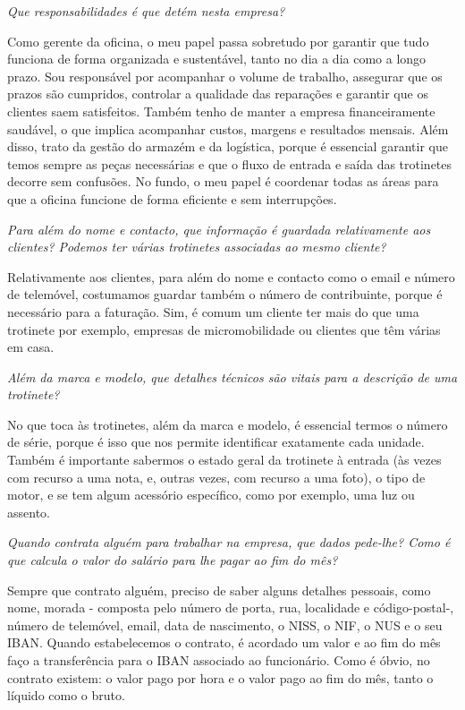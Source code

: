 \documentclass[11pt,a4paper]{article}
\newcommand{\pergunta}[1]{\item[P:] \textit{#1}}
\newcommand{\resposta}[1]{\item[R:] #1}
\begin{document}
	\begin{transcription}
		
		\pergunta{Que responsabilidades é que detém nesta empresa?}
		
		\resposta{Como gerente da oficina, o meu papel passa sobretudo por garantir que tudo funciona de forma organizada e sustentável, tanto no dia a dia como a longo prazo. Sou responsável por acompanhar o volume de trabalho, assegurar que os prazos são cumpridos, controlar a qualidade das reparações e garantir que os clientes saem satisfeitos. Também tenho de manter a empresa financeiramente saudável, o que implica acompanhar custos, margens e resultados mensais. Além disso, trato da gestão do armazém e da logística, porque é essencial garantir que temos sempre as peças necessárias e que o fluxo de entrada e saída das trotinetes decorre sem confusões. No fundo, o meu papel é coordenar todas as áreas para que a oficina funcione de forma eficiente e sem interrupções.}
		
		\pergunta{Para além do nome e contacto, que informação é guardada relativamente aos clientes? Podemos ter várias trotinetes associadas ao mesmo cliente?}
		
		\resposta{Relativamente aos clientes, para além do nome e contacto como o email e número de telemóvel, costumamos guardar também o número de contribuinte, porque é necessário para a faturação.  Sim, é comum um cliente ter mais do que uma trotinete por exemplo, empresas de micromobilidade ou clientes que têm várias em casa.}
		
		\pergunta{Além da marca e modelo, que detalhes técnicos são vitais para a descrição de uma trotinete?}	
		
		\resposta{No que toca às trotinetes, além da marca e modelo, é essencial termos o número de série, porque é isso que nos permite identificar exatamente cada unidade. Também é importante sabermos o estado geral da trotinete à entrada (às vezes com recurso a uma nota, e, outras vezes, com recurso a uma foto), o tipo de motor, e se tem algum acessório específico, como por exemplo, uma luz ou assento.}
		
		\pergunta{Quando contrata alguém para trabalhar na empresa, que dados pede-lhe? Como é que calcula o valor do salário para lhe pagar ao fim do mês?}
		
		\resposta{Sempre que contrato alguém, preciso de saber alguns detalhes pessoais, como nome, morada - composta pelo número de porta, rua, localidade e código-postal-, número de telemóvel, email, data de nascimento, o NISS, o NIF, o NUS e o seu IBAN. Quando estabelecemos o contrato, é acordado um valor e ao fim do mês faço a transferência para o IBAN associado ao funcionário. Como é óbvio, no contrato existem: o valor pago por hora e o valor pago ao fim do mês, tanto o líquido como o bruto.}
		

\end{transcription}
\end{document}
